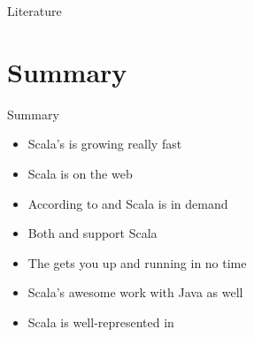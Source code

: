 \begin{frame}{Literature}
\begin{center}
\end{center}
\begin{center}
\end{center}
\end{frame}

\section{Summary}
\begin{frame}{Summary}
\begin{itemize}
  \item Scala's  is growing really fast
  \item Scala is  on the web
  \item According to  and  Scala is
  in demand
  \item Both  and  support Scala
  \item The  gets you up and running in no time
  \item Scala's awesome  work with Java as well
  \item Scala is well-represented in 
\end{itemize}
\end{frame}